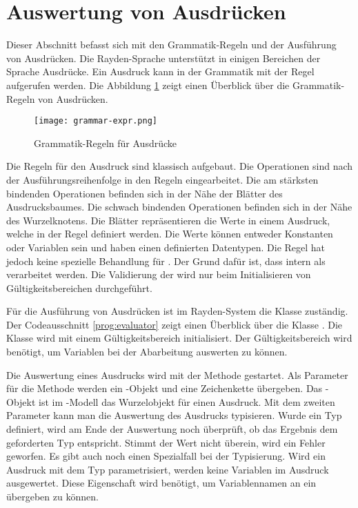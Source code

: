 \clearpage

\section{Auswertung von Ausdrücken}
\label{cha:Eval}

Dieser Abschnitt befasst sich mit den Grammatik-Regeln und der Ausführung von Ausdrücken. Die Rayden-Sprache unterstützt in einigen Bereichen der Sprache Ausdrücke. Ein Ausdruck kann in der Grammatik mit der Regel  aufgerufen werden. Die Abbildung \ref{fig:exprGrammar} zeigt einen Überblick über die Grammatik-Regeln von Ausdrücken. 

\begin{figure}
\centering
\texttt{[image: grammar-expr.png]}
\caption{Grammatik-Regeln für Ausdrücke}
\label{fig:exprGrammar}
\end{figure}

\SuperPar
Die Regeln für den Ausdruck sind klassisch aufgebaut. Die Operationen sind nach der Ausführungsreihenfolge in den Regeln eingearbeitet. Die am stärksten bindenden Operationen befinden sich in der Nähe der Blätter des Ausdrucksbaumes. Die schwach bindenden Operationen befinden sich in der Nähe des Wurzelknotens. Die Blätter repräsentieren die Werte in einem Ausdruck, welche in der Regel  definiert werden. Die Werte können entweder Konstanten oder Variablen sein und haben einen definierten Datentypen. Die Regel  hat jedoch keine spezielle Behandlung für . Der Grund dafür ist, dass  intern als  verarbeitet werden. Die Validierung der  wird nur beim Initialisieren von Gültigkeitsbereichen durchgeführt.

\SuperPar
Für die Ausführung von Ausdrücken ist im Rayden-System die Klasse  zuständig. Der Codeausschnitt \ref{prog:evaluator} zeigt einen Überblick über die Klasse . Die Klasse wird mit einem Gültigkeitsbereich initialisiert. Der Gültigkeitsbereich wird benötigt, um Variablen bei der Abarbeitung auswerten zu können. 

\SuperPar
Die Auswertung eines Ausdrucks wird mit der Methode  gestartet. Als Parameter für die Methode werden ein -Objekt und eine Zeichenkette übergeben. Das -Objekt ist im -Modell das Wurzelobjekt für einen Ausdruck. Mit dem zweiten Parameter kann man die Auswertung des Ausdrucks typisieren. Wurde ein Typ definiert, wird am Ende der Auswertung noch überprüft, ob das Ergebnis dem geforderten Typ entspricht. Stimmt der Wert nicht überein, wird ein Fehler geworfen. Es gibt auch noch einen Spezialfall bei der Typisierung. Wird ein Ausdruck mit dem Typ  parametrisiert, werden keine Variablen im Ausdruck ausgewertet. Diese Eigenschaft wird benötigt, um Variablennamen an ein  übergeben zu können.

